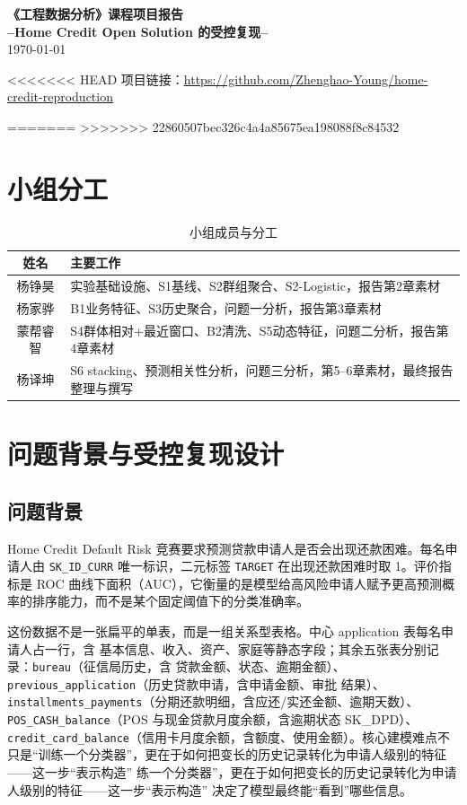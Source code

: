 \documentclass[12pt,UTF8,fontset=windows]{ctexart}
\begin{document}
\begingroup
\centering
\vspace{24pt}
{\LARGE\bfseries《工程数据分析》课程项目报告}\\[6pt]
{\large\bfseries --Home Credit Open Solution 的受控复现--}\\[10pt]
{\normalsize \today}
\par
\endgroup
\vspace{4pt}

<<<<<<< HEAD
项目链接：\url{https://github.com/Zhenghao-Young/home-credit-reproduction}

=======
>>>>>>> 22860507bec326c4a4a85675ea198088f8c84532
\section{小组分工}

\begin{table}[h]
\centering\small
\caption{小组成员与分工}
\begin{tabular}{cl}
\toprule
姓名 & 主要工作 \\
\midrule
杨铮昊 & 实验基础设施、S1基线、S2群组聚合、S2-Logistic，报告第2章素材 \\
杨家骅 & B1业务特征、S3历史聚合，问题一分析，报告第3章素材 \\
蒙帮睿智 & S4群体相对+最近窗口、B2清洗、S5动态特征，问题二分析，报告第4章素材 \\
杨译坤 & S6 stacking、预测相关性分析，问题三分析，第5--6章素材，最终报告整理与撰写 \\
\bottomrule
\end{tabular}
\end{table}

\section{问题背景与受控复现设计}

\subsection{问题背景}

Home Credit Default Risk 竞赛要求预测贷款申请人是否会出现还款困难。每名申请人由 \texttt{SK\_ID\_CURR} 唯一标识，二元标签 \texttt{TARGET} 在出现还款困难时取 1。评价指标是 ROC 曲线下面积（AUC），它衡量的是模型给高风险申请人赋予更高预测概率的排序能力，而不是某个固定阈值下的分类准确率。


这份数据不是一张扁平的单表，而是一组关系型表格。中心 application 表每名申请人占一行，含
基本信息、收入、资产、家庭等静态字段；其余五张表分别记录：\texttt{bureau}（征信局历史，含
贷款金额、状态、逾期金额）、\texttt{previous\_application}（历史贷款申请，含申请金额、审批
结果）、\texttt{installments\_payments}（分期还款明细，含应还/实还金额、逾期天数）、
\texttt{POS\_CASH\_balance}（POS 与现金贷款月度余额，含逾期状态 SK\_DPD）、
\texttt{credit\_card\_balance}（信用卡月度余额，含额度、使用金额）。核心建模难点不只是“训练一个分类器”，更在于如何把变长的历史记录转化为申请人级别的特征——这一步“表示构造”
练一个分类器”，更在于如何把变长的历史记录转化为申请人级别的特征——这一步“表示构造”
决定了模型最终能“看到”哪些信息。
\end{document}
